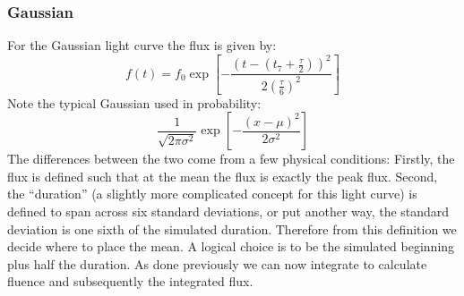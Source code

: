 \documentclass{article}
\begin{document}
\subsubsection{Gaussian}
For the Gaussian light curve the flux is given by:
\[f(t) = f_0  \exp[-\frac{(t-(t_7+\frac{\tau}{2}))^2}{2(\frac{\tau}{6})^2}]\]
Note the typical Gaussian used in probability:
\[ \frac{1}{\sqrt{2\pi\sigma^2}}\exp[-\frac{(x-\mu)^2}{2\sigma^2}]\]
The differences between the two come from a few physical conditions: Firstly, the flux is defined such that at the mean the flux is exactly the peak flux. Second, the ``duration'' (a slightly more complicated concept for this light curve) is defined to span across six standard deviations, or put another way, the standard deviation is one sixth of the simulated duration. Therefore from this definition we decide where to place the mean. A logical choice is to be the simulated beginning plus half the duration. As done previously we can now integrate to calculate fluence and subsequently the integrated flux. 
\end{document}
